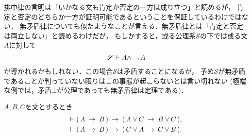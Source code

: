 	排中律の言明は「いかなる文も肯定か否定の一方は成り立つ」と読めるが，
	肯定と否定のどちらか一方が証明可能であるということを保証しているわけではない．
	無矛盾律についても似たようなことが言える．無矛盾律とは「肯定と否定は両立しない」と読めるわけだが，
	もしかすると，或る公理系$\mathscr{S}$の下では或る文$A$に対して
	\begin{align}
		\mathscr{S} \vdash A \wedge \rightharpoondown\hspace{-0.25em} A
	\end{align}
	が導かれるかもしれない．この場合$\mathscr{S}$は矛盾することになるが，
	予め$\mathscr{S}$が無矛盾であることが判っていない限りはこの事態が起こらないとは言い切れない
	(極端な例では，矛盾$\bot$が公理であっても無矛盾律は定理である)．
	
	\begin{screen}
		\begin{logicalthm}[含意の論理和への遺伝性]
		\label{logicalthm:heredity_of_implication_to_disjunction}
			$A,B,C$を文とするとき
			\begin{align}
				\vdash (\, A \hspace{0.25em}\rightarrow\hspace{0.25em} B\, ) \hspace{0.25em}\rightarrow\hspace{0.25em} (\, A \vee C \hspace{0.25em}\rightarrow\hspace{0.25em} B \vee C\, ), \\
				\vdash (\, A \hspace{0.25em}\rightarrow\hspace{0.25em} B\, ) \hspace{0.25em}\rightarrow\hspace{0.25em} (\, C \vee A \hspace{0.25em}\rightarrow\hspace{0.25em} C \vee B\, ).
			\end{align}
		\end{logicalthm}
	\end{screen}
	
